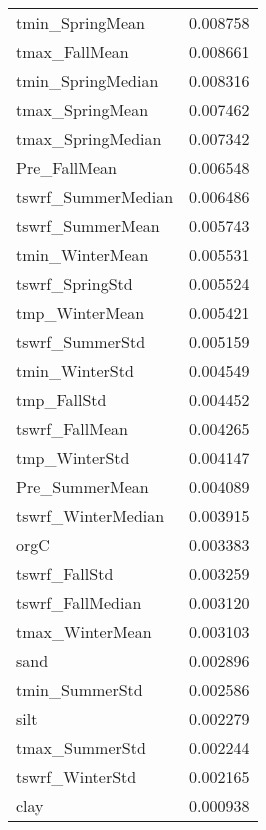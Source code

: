 \begin{tabular}{lr}
tmin_SpringMean & 0.008758 \\
tmax_FallMean & 0.008661 \\
tmin_SpringMedian & 0.008316 \\
tmax_SpringMean & 0.007462 \\
tmax_SpringMedian & 0.007342 \\
Pre_FallMean & 0.006548 \\
tswrf_SummerMedian & 0.006486 \\
tswrf_SummerMean & 0.005743 \\
tmin_WinterMean & 0.005531 \\
tswrf_SpringStd & 0.005524 \\
tmp_WinterMean & 0.005421 \\
tswrf_SummerStd & 0.005159 \\
tmin_WinterStd & 0.004549 \\
tmp_FallStd & 0.004452 \\
tswrf_FallMean & 0.004265 \\
tmp_WinterStd & 0.004147 \\
Pre_SummerMean & 0.004089 \\
tswrf_WinterMedian & 0.003915 \\
orgC & 0.003383 \\
tswrf_FallStd & 0.003259 \\
tswrf_FallMedian & 0.003120 \\
tmax_WinterMean & 0.003103 \\
sand & 0.002896 \\
tmin_SummerStd & 0.002586 \\
silt & 0.002279 \\
tmax_SummerStd & 0.002244 \\
tswrf_WinterStd & 0.002165 \\
clay & 0.000938 \\
\bottomrule
\end{tabular}
